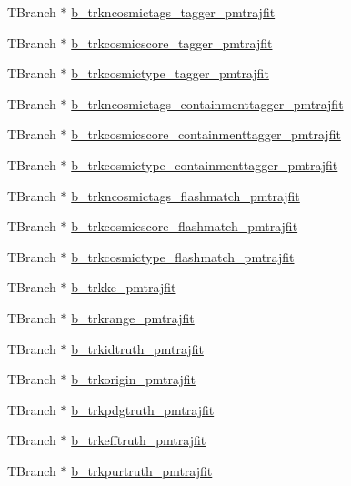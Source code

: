 \begin{DoxyCompactItemize}
\item 
T\-Branch $\ast$ \hyperlink{classanatree_a2d347ece74a7feaa3b3b6f84cfcc6762}{b\-\_\-trkncosmictags\-\_\-tagger\-\_\-pmtrajfit}
\item 
T\-Branch $\ast$ \hyperlink{classanatree_a96393f76e6144f2247e0ef1a2ea6a23f}{b\-\_\-trkcosmicscore\-\_\-tagger\-\_\-pmtrajfit}
\item 
T\-Branch $\ast$ \hyperlink{classanatree_a258a0dcb534bcb3445a0e776f4a8f919}{b\-\_\-trkcosmictype\-\_\-tagger\-\_\-pmtrajfit}
\item 
T\-Branch $\ast$ \hyperlink{classanatree_aa28179040a444e1a0406d75a9613f6a6}{b\-\_\-trkncosmictags\-\_\-containmenttagger\-\_\-pmtrajfit}
\item 
T\-Branch $\ast$ \hyperlink{classanatree_a0bb8556488bdf0db83ed7e69c382eaa2}{b\-\_\-trkcosmicscore\-\_\-containmenttagger\-\_\-pmtrajfit}
\item 
T\-Branch $\ast$ \hyperlink{classanatree_a1fa7878ea1a693f4881989480cda2414}{b\-\_\-trkcosmictype\-\_\-containmenttagger\-\_\-pmtrajfit}
\item 
T\-Branch $\ast$ \hyperlink{classanatree_a102fec579615dd3c32ffc3af660db375}{b\-\_\-trkncosmictags\-\_\-flashmatch\-\_\-pmtrajfit}
\item 
T\-Branch $\ast$ \hyperlink{classanatree_a2f607a0a29a2e7eaaefad1255c36f378}{b\-\_\-trkcosmicscore\-\_\-flashmatch\-\_\-pmtrajfit}
\item 
T\-Branch $\ast$ \hyperlink{classanatree_a97ff55d779c97fcb01671ebc648a5a2b}{b\-\_\-trkcosmictype\-\_\-flashmatch\-\_\-pmtrajfit}
\item 
T\-Branch $\ast$ \hyperlink{classanatree_ac6d21bd2aa391cbe593b3a8d60e9d75b}{b\-\_\-trkke\-\_\-pmtrajfit}
\item 
T\-Branch $\ast$ \hyperlink{classanatree_ad06f3f694380e0595b922f65a2a08f8c}{b\-\_\-trkrange\-\_\-pmtrajfit}
\item 
T\-Branch $\ast$ \hyperlink{classanatree_a1af9561a17956088cedad9486480d01c}{b\-\_\-trkidtruth\-\_\-pmtrajfit}
\item 
T\-Branch $\ast$ \hyperlink{classanatree_a97902af9fabebff2666c6946e86da22d}{b\-\_\-trkorigin\-\_\-pmtrajfit}
\item 
T\-Branch $\ast$ \hyperlink{classanatree_ad99bb6a5f890d8e503485828be98a96d}{b\-\_\-trkpdgtruth\-\_\-pmtrajfit}
\item 
T\-Branch $\ast$ \hyperlink{classanatree_ac1d4fc90c60034641aec255b90304853}{b\-\_\-trkefftruth\-\_\-pmtrajfit}
\item 
T\-Branch $\ast$ \hyperlink{classanatree_a3e0df2cd601679bc3faccd31bee80520}{b\-\_\-trkpurtruth\-\_\-pmtrajfit}

\end{DoxyCompactItemize}
